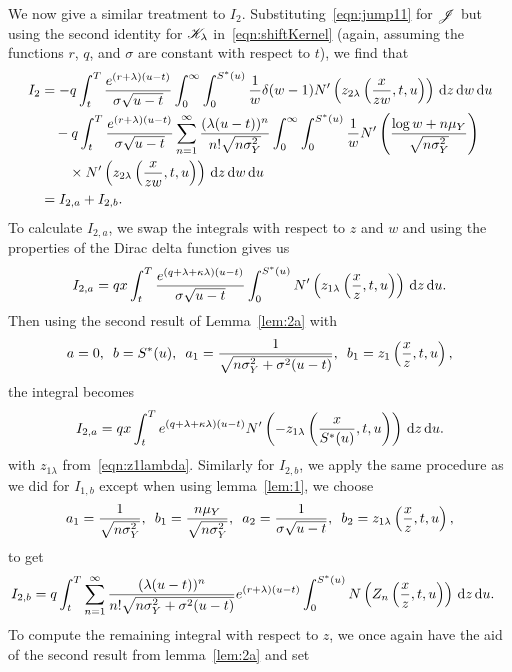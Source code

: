 		We now give a similar treatment to $I_2$. Substituting~\eqref{eqn:jump11} for $\mathscr J$ but using the second identity for $\mathscr K_\lambda$ in~\eqref{eqn:shiftKernel} (again, assuming the functions $r$, $q$, and $\sigma$ are constant with respect to $t$), we find that
		\begin{align*}
        			I_2 &= -q\int_t^T \frac{e^{(r+\lambda)(u-t)}}{\sigma\sqrt{u-t}} \int_0^\infty\int_0^{S^*(u)} \frac{1}{w} \delta(w-1) N'\left( z_{2\lambda}\left( \frac{x}{zw}, t, u \right) \right) \, \mathrm d z \, \mathrm d w \, \mathrm d u \\
        			& {}\quad -q\int_t^T \frac{e^{(r+\lambda)(u-t)}}{\sigma\sqrt{u-t}} \displaystyle\sum\limits_{n=1}^{\infty} \frac{(\lambda(u-t))^n}{n!\sqrt{n\sigma_Y^2}}\int_0^\infty \int_0^{S^*(u)} \frac{1}{w}N'\left( \frac{\log w + n\mu_Y}{\sqrt{n\sigma_Y^2}} \right) \\
        			& {} \quad \quad \times N'\left( z_{2\lambda}\left( \frac{x}{zw}, t, u \right) \right) \, \mathrm d z \, \mathrm d w \, \mathrm d u \\
        			&= I_{2,a} + I_{2,b}.
        		\end{align*}
		To calculate $I_{2,a}$, we swap the integrals with respect to $z$ and $w$ and using the properties of the Dirac delta function gives us
			$$
				I_{2,a} = qx\int_t^T \frac{e^{(q+\lambda+\kappa\lambda)(u-t)}}{\sigma\sqrt{u-t}}\int_0^{S^*(u)} N'\left( z_{1\lambda}\left( \frac{x}{z}, t, u \right) \right) \, \mathrm d z \, \mathrm d u.
			$$
		Then using the second result of Lemma~\ref{lem:2a} with
			$$
				a = 0, \enskip b = S^*(u), \enskip a_1 = \frac{1}{\sqrt{n\sigma_Y^2 + \sigma^2(u-t)}}, \enskip
			b_1 = z_1\left( \frac{x}{z}, t, u \right),
			$$
		the integral becomes
			$$
				I_{2,a} = qx\int_t^T e^{(q+\lambda+\kappa\lambda)(u-t)} N'\left(-z_{1\lambda}\left( \frac{x}{S^*(u)}, t, u \right) \right) \, \mathrm d z \, \mathrm d u.
			$$
		with $z_{1\lambda}$ from~\eqref{eqn:z1lambda}. Similarly for $I_{2,b}$, we apply the same procedure as we did for $I_{1,b}$ except when using lemma~\ref{lem:1}, we choose
			$$
        			a_1 = \frac{1}{\sqrt{n\sigma_Y^2}}, \enskip b_1 = \frac{n\mu_Y}{\sqrt{n\sigma_Y^2}}, \enskip
        			a_2 = \frac{1}{\sigma\sqrt{u-t}}, \enskip b_2 = z_{1\lambda}\left( \frac{x}{z}, t, u\right),
        		$$
	to get
			\begin{align*}
				I_{2,b} &= q  \int_t^T  \displaystyle\sum\limits_{n=1}^{\infty} \frac{(\lambda(u-t))^n}{n!\sqrt{n\sigma_Y^2 + \sigma^2(u-t)}}  e^{(r+\lambda)(u-t)} \int_0^{S^*(u)} N\left( Z_n \left( \frac{x}{z},t,u  \right) \right) \,\mathrm d z \, \mathrm d u.
			\end{align*}
	To compute the remaining integral with respect to $z$, we once again have the aid of the second result from lemma~\ref{lem:2a} and set
